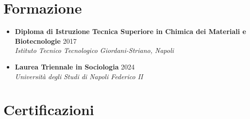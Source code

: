 \documentclass[a4paper,12pt]{article}
\begin{document}
\section{Formazione}
\begin{itemize}[leftmargin=*]
    \item \textbf{Diploma di Istruzione Tecnica Superiore in Chimica dei Materiali e Biotecnologie} \hfill 2017\\
    \textit{Istituto Tecnico Tecnologico Giordani-Striano, Napoli}
    \item \textbf{Laurea Triennale in Sociologia} \hfill 2024\\
    \textit{Università degli Studi di Napoli Federico II}
\end{itemize}

\section{Certificazioni}
\end{document}
